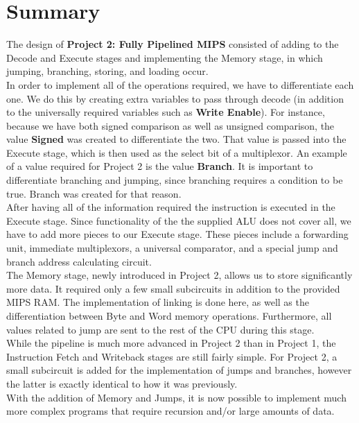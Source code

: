 \documentclass{article}
\begin{document}
\section{Summary}
The design of \textbf{Project 2: Fully Pipelined MIPS} consisted of adding to the Decode and Execute stages and implementing the Memory stage, in which jumping, branching, storing, and loading occur.  \\

\noindent In order to implement all of the operations required, we have to differentiate each one. We do this by creating extra variables to pass through decode (in addition to the universally required variables such as \textbf{Write Enable}). For instance, because we have both signed comparison as well as unsigned comparison, the value \textbf{Signed} was created to differentiate the two. That value is passed into the Execute stage, which is then used as the select bit of a multiplexor. An example of a value required for Project 2 is the value \textbf{Branch}. It is important to differentiate branching and jumping, since branching requires a condition to be true. Branch was created for that reason.\\

\noindent After having all of the information required the instruction is executed in the Execute stage. Since functionality of the the supplied ALU does not cover all, we have to add more pieces to our Execute stage. These pieces include a forwarding unit, immediate multiplexors, a universal comparator, and a special jump and branch address calculating circuit. \\

\noindent The Memory stage, newly introduced in Project 2, allows us to store significantly more data. It required only a few small subcircuits in addition to the provided MIPS RAM. The implementation of linking is done here, as well as the differentiation between Byte and Word memory operations. Furthermore, all values related to jump are sent to the rest of the CPU during this stage.  \\

\noindent While the pipeline is much more advanced in Project 2 than in Project 1, the Instruction Fetch and Writeback stages are still fairly simple. For Project 2, a small subcircuit is added for the implementation of jumps and branches, however the latter is exactly identical to how it was previously. \\

\noindent With the addition of Memory and Jumps, it is now possible to implement much more complex programs that require recursion and/or large amounts of data.
\end{document}
